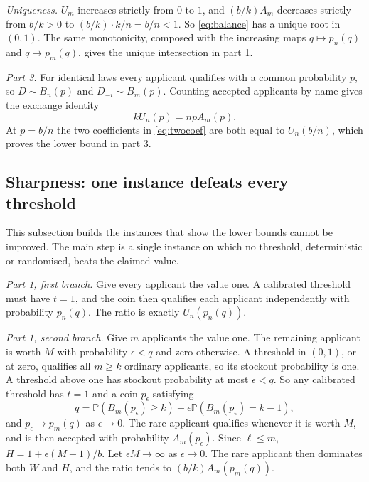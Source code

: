 \documentclass[11pt,a4paper]{article}
\theoremstyle{remark}
\newcommand{\Prob}{\mathbb P}
\begin{document}
\emph{Uniqueness.} $U_m$ increases strictly from $0$ to $1$, and $(b/k)A_m$ decreases strictly from $b/k>0$ to $(b/k)\cdot k/n=b/n<1$. So \eqref{eq:balance} has a unique root in $(0,1)$. The same monotonicity, composed with the increasing maps $q\mapsto p_n(q)$ and $q\mapsto p_m(q)$, gives the unique intersection in part 1.

\emph{Part 3.} For identical laws every applicant qualifies with a common probability $p$, so $D\sim B_n(p)$ and $D_{-i}\sim B_m(p)$. Counting accepted applicants by name gives the exchange identity
\begin{equation}\label{eq:exchange}
 kU_n(p)=npA_m(p).
\end{equation}
At $p=b/n$ the two coefficients in \eqref{eq:twocoef} are both equal to $U_n(b/n)$, which proves the lower bound in part 3.

\subsection{Sharpness: one instance defeats every threshold}\label{sec:sharp}
This subsection builds the instances that show the lower bounds cannot be improved. The main step is a single instance on which no threshold, deterministic or randomised, beats the claimed value.

\emph{Part 1, first branch.} Give every applicant the value one. A calibrated threshold must have $t=1$, and the coin then qualifies each applicant independently with probability $p_n(q)$. The ratio is exactly $U_n(p_n(q))$.

\emph{Part 1, second branch.} Give $m$ applicants the value one. The remaining applicant is worth $M$ with probability $\epsilon<q$ and zero otherwise. A threshold in $(0,1)$, or at zero, qualifies all $m\ge k$ ordinary applicants, so its stockout probability is one. A threshold above one has stockout probability at most $\epsilon<q$. So any calibrated threshold has $t=1$ and a coin $p_\epsilon$ satisfying
\[
 q=\Prob(B_m(p_\epsilon)\ge k)+\epsilon\Prob(B_m(p_\epsilon)=k-1),
\]
and $p_\epsilon\to p_m(q)$ as $\epsilon\to0$. The rare applicant qualifies whenever it is worth $M$, and is then accepted with probability $A_m(p_\epsilon)$. Since $\ell\le m$, $H=1+\epsilon(M-1)/b$. Let $\epsilon M\to\infty$ as $\epsilon\to0$. The rare applicant then dominates both $W$ and $H$, and the ratio tends to $(b/k)A_m(p_m(q))$.
\end{document}
